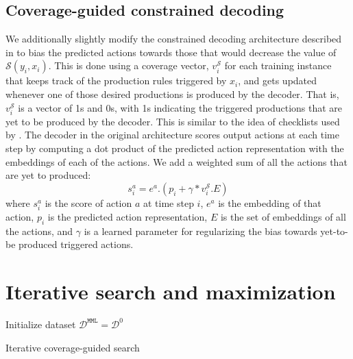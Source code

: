 \subsection{Coverage-guided constrained decoding}
We additionally slightly modify the constrained decoding architecture described in  to bias the predicted actions towards those that would decrease the value of $\mathcal{S}(y_i, x_i)$. This is done using a coverage vector, $v^{\mathcal{S}}_i$ for each training instance that keeps track of the production rules triggered by $x_i$, and gets updated whenever one of those desired productions is produced by the decoder. That is, $v^{\mathcal{S}}_i$ is a vector of 1s and 0s, with 1s indicating the triggered productions that are yet to be produced by the decoder. This is similar to the idea of checklists used by \citet{kiddon2016globally}. The decoder in the original architecture scores output actions at each time step by computing a dot product of the predicted action representation with the embeddings of each of the actions. We add a weighted sum of all the actions that are yet to produced:
\begin{equation}
	s^a_i = e^a . (p_i + \gamma * v^{\mathcal{S}}_i . E)
\end{equation}
where $s^a_i$ is the score of action $a$ at time step $i$, $e^a$ is the embedding of that action, $p_i$ is the predicted action representation, $E$ is the set of embeddings of all the actions, and $\gamma$ is a learned parameter for regularizing the bias towards yet-to-be produced triggered actions.

\section{Iterative search and maximization} \label{sec:iterative_search}
\begin{algorithm}[h!]
	\SetAlgoLined
	Initialize dataset $\mathcal{D}^{\texttt{MML}} = \mathcal{D}^0$\;
	\caption{Iterative coverage-guided search}\label{alg:iterative_search}
\end{algorithm}

